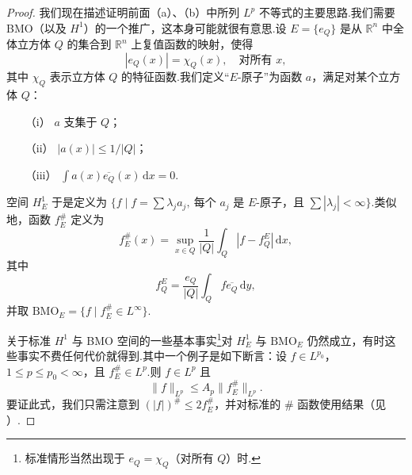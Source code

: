 \documentclass[
  BookTitleCN={傅里叶分析中的振动积分},
  BookTitleEN={Oscillatory Integrals in Fourier Analysis},
  OriginalAuthor={E.~M. Stein},
  OriginalEdition={Proc. Sympos. Pure Math. 35, Part~1},
  OriginalPublisher={American Mathematical Society},
  OriginalYear={1979},
  Translator={翻译及重排},
  ModelUsed={Codex CLI},
  Biblatex=false,
  TranslationDate={2026年8月27日}
]{mathtranslation}
\numberwithin{equation}{chapter}   %
\newcommand{\R}{\mathbb{R}}
\begin{document}
\begin{proof}
  我们现在描述证明前面（a）、（b）中所列 $L^{p}$ 不等式的主要思路.我们需要 BMO（以及 $H^{1}$）的一个推广，这本身可能就很有意思.设 $E=\{e_{Q}\}$ 是从 $\R^{n}$ 中全体立方体 $Q$ 的集合到 $\R^{n}$ 上复值函数的映射，使得
  \[
    |e_{Q}(x)|=\chi_{Q}(x),\quad\text{对所有 }x,
  \]
  其中 $\chi_{Q}$ 表示立方体 $Q$ 的特征函数.我们定义``$E$-原子''为函数 $a$，满足对某个立方体 $Q$：
  \begin{enumerate}
    \item[（i）] $a$ 支集于 $Q$；
    \item[（ii）] $|a(x)|\leq1/|Q|$；
    \item[（iii）] $\int a(x)\overline{e_{Q}}(x)\,\mathrm{d}x=0$.
  \end{enumerate}
  空间 $H_{E}^{1}$ 于是定义为 $\{f\mid f=\sum\lambda_{j}a_{j},\ \text{每个 }a_{j}\text{ 是 }E\text{-原子，且 }\sum|\lambda_{j}|<\infty\}$.类似地，函数 $f_{E}^{\#}$ 定义为
  \begin{equation}
    f_{E}^{\#}(x)=\sup_{x\in Q}\frac{1}{|Q|}\int_{Q}|f-f_{Q}^{E}|\,\mathrm{d}x, \label{eq:6.8}
  \end{equation}
  其中
  \[
    f_{Q}^{E}=\frac{e_{Q}}{|Q|}\int_{Q}f\overline{e_{Q}}\,\mathrm{d}y,
  \]
  并取 $\mathrm{BMO}_{E}=\{f\mid f_{E}^{\#}\in L^{\infty}\}$.

  关于标准 $H^{1}$ 与 BMO 空间的一些基本事实\footnote{标准情形当然出现于 $e_{Q}=\chi_{Q}$（对所有 $Q$）时.}对 $H_{E}^{1}$ 与 $\mathrm{BMO}_{E}$ 仍然成立，有时这些事实不费任何代价就得到.其中一个例子是如下断言：设 $f\in L^{p_{0}}$，$1\leq p\leq p_{0}<\infty$，且 $f_{E}^{\#}\in L^{p}$.则 $f\in L^{p}$ 且
  \begin{equation}
    \|f\|_{L^{p}}\leq A_{p}\|f_{E}^{\#}\|_{L^{p}}. \label{eq:6.9}
  \end{equation}
  要证此式，我们只需注意到 $(|f|)^{\#}\leq2f_{E}^{\#}$，并对标准的 $\#$ 函数使用结果（见 \cite{ref10}）.


\end{proof}
\end{document}

